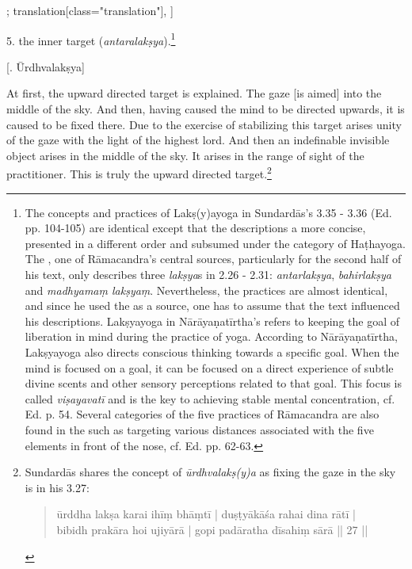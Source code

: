 \begin{alignment}[
  texts=edition[class="edition"];
  translation[class="translation"],
  ]
\begin{translation}
\begin{tlate}
   5. the inner target (\textit{antaralakṣya}).\textsuperscript{\coro{[\lowroman{3}]}}\footnote{The concepts and practices of Lakṣ(y)ayoga in Sundardās's  3.35 - 3.36 (Ed. pp. 104-105) are identical except that the descriptions a more concise, presented in a different order and subsumed under the category of Haṭhayoga. The , one of Rāmacandra's central sources, particularly for the second half of his text, only describes three \textit{lakṣya}s in 2.26 - 2.31: \textit{antarlakṣya}, \textit{bahirlakṣya} and \textit{madhyamaṃ lakṣyaṃ}. Nevertheless, the practices are almost identical, and since he used the  as a source, one has to assume that the text influenced his descriptions. Lakṣyayoga in Nārāyaṇatīrtha's  refers to keeping the goal of liberation in mind during the practice of yoga. According to Nārāyaṇatīrtha, Lakṣyayoga also directs conscious thinking towards a specific goal. When the mind is focused on a goal, it can be focused on a direct experience of subtle divine scents and other sensory perceptions related to that goal. This focus is called \textit{viṣayavatī} and is the key to achieving stable mental concentration, cf. Ed. p. 54. Several categories of the five practices of Rāmacandra are also found in the  such as targeting various distances associated with the five elements in front of the nose, cf. Ed. pp. 62-63.}
 \end{tlate}
     \smallskip
     \centerline{\textrm{\small{[.\textsuperscript{} Ūrdhvalakṣya]}}}
     \label{urdhvalaksyatrans}
    \bigskip    
  \begin{tlate}
    At first, the upward directed target is explained. The gaze [is aimed] into the middle of the sky. And then, having caused the mind to be directed upwards, it is caused to be fixed there. Due to the exercise of stabilizing this target arises unity of the gaze with the light of the highest lord. And then an indefinable invisible object arises in the middle of the sky.\textsuperscript{\coro{[\lowroman{5}]}} It arises in the range of sight of the practitioner. This is truly the upward directed target.\footnote{Sundardās shares the concept of \textit{ūrdhvalakṣ(y)a} as fixing the gaze in the sky is in his  3.27: 
\begin{quote}
ūrddha lakṣa karai ihīṃ bhāṃtī | duṣṭyākāśa rahai dina rātī |\\ 
bibidh prakāra hoi ujiyārā | gopi padāratha dīsahiṃ sārā || 27 ||

\end{quote}}
\end{tlate}
\end{translation}
\end{alignment}
